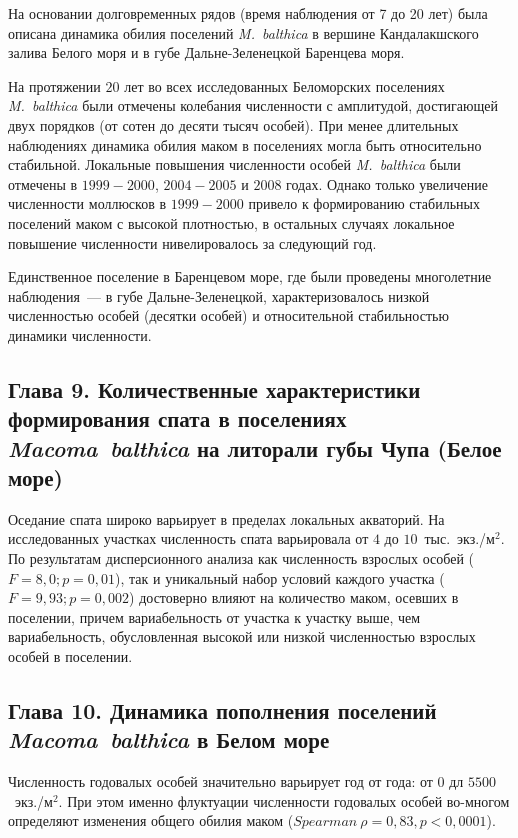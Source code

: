{{На основании долговременных рядов (время наблюдения от 7 до 20 лет) была описана динамика обилия поселений \textit{M.~balthica} в вершине Кандалакшского залива Белого моря и в губе Дальне-Зеленецкой Баренцева моря.

На протяжении $20$ лет во всех исследованных Беломорских поселениях \textit{M.~balthica} были отмечены колебания численности с амплитудой, достигающей двух порядков (от сотен до десяти тысяч особей).
При менее длительных наблюдениях динамика обилия маком в поселениях могла быть относительно стабильной.
Локальные повышения численности особей \textit{M.~balthica} были отмечены в $1999-2000$, $2004-2005$ и $2008$ годах.
Однако только увеличение численности моллюсков в $1999-2000$ привело к формированию стабильных поселений маком с высокой плотностью, в остальных случаях локальное повышение численности нивелировалось за следующий год.

Единственное поселение в Баренцевом море, где были проведены многолетние наблюдения~--- в губе Дальне-Зеленецкой, характеризовалось низкой численностью особей (десятки особей) и относительной стабильностью динамики численности. 

\subsection*{Глава 9. Количественные характеристики формирования спата в поселениях \textit{Macoma~balthica} на литорали губы Чупа (Белое море)} 

Оседание спата широко варьирует в пределах локальных акваторий.
На исследованных участках численность спата варьировала от $4$ до $10$~тыс.~экз./м$^2$.
По результатам дисперсионного анализа как численность взрослых особей ($F = 8,0; p = 0,01$), так и уникальный набор условий каждого участка ($F = 9,93; p = 0,002$) достоверно влияют на количество маком, осевших в поселении, причем вариабельность от участка к участку выше, чем вариабельность, обусловленная высокой или низкой численностью взрослых особей в поселении. 

\subsection*{Глава 10. Динамика пополнения поселений \textit{Macoma~balthica} в Белом море}

Численность годовалых особей значительно варьирует год от года: от $0$ дл $5500$~экз./м$^2$.
При этом именно флуктуации численности годовалых особей во-многом определяют изменения общего обилия маком ($Spearman\ \rho = 0,83, p < 0,0001$).

}}
